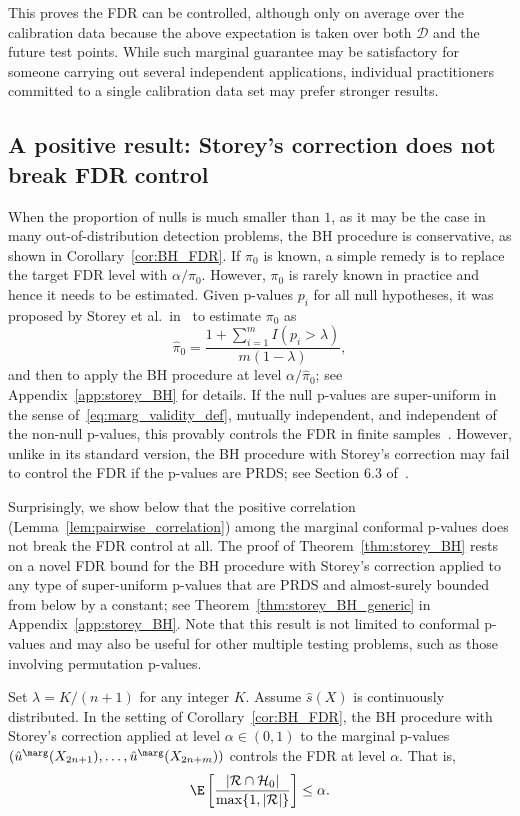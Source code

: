 This proves the FDR can be controlled, although only on average over the calibration data because the above expectation is taken over both $\mathcal{D}$ and the future test points.
While such marginal guarantee may be satisfactory for someone carrying out several independent applications, individual practitioners committed to a single calibration data set may prefer stronger results.

\subsection{A positive result: Storey's correction does not break FDR control}
When the proportion of nulls is much smaller than $1$, as it may be the case in many out-of-distribution detection problems, the BH procedure is conservative, as shown in Corollary~\ref{cor:BH_FDR}. If $\pi_0$ is known, a simple remedy is to replace the target FDR level with $\alpha / \pi_0$. However, $\pi_0$ is rarely known in practice and hence it needs to be estimated. Given p-values $p_i$ for all null hypotheses, it was proposed by Storey et al.~in~\cite{storey2002direct,storey2004strong} to estimate $\pi_0$ as
\[\hat{\pi}_0 = \frac{1 + \sum_{i=1}^{m}I(p_i > \lambda)}{m(1 - \lambda)},\]
and then to apply the BH procedure at level $\alpha / \hat{\pi}_0$; see Appendix~\ref{app:storey_BH} for details.
If the null p-values are super-uniform {in the sense of~\eqref{eq:marg_validity_def}}, mutually independent, and independent of the non-null
p-values, this provably controls the FDR in finite samples~\cite{storey2004strong}.
However, unlike in its standard version, the BH procedure with Storey's correction may fail to control the FDR if the p-values are PRDS; see Section 6.3 of~\cite{benjamini2006adaptive}.

Surprisingly, we show below that the positive correlation (Lemma~\ref{lem:pairwise_correlation}) among the marginal conformal p-values does not break the FDR control at all. The proof of Theorem~\ref{thm:storey_BH} rests on a novel FDR bound for the BH procedure with Storey's correction applied to any type of super-uniform p-values that are PRDS and almost-surely bounded from below by a constant; see Theorem~\ref{thm:storey_BH_generic} in Appendix~\ref{app:storey_BH}. Note that this result is not limited to conformal p-values and may also be useful for other multiple testing problems, such as those involving permutation p-values.

\begin{thm}\label{thm:storey_BH}
Set $\lambda = K / (n+1)$ for any integer $K$. Assume $\hat{s}(X)$ is continuously distributed. In the setting of Corollary~\ref{cor:BH_FDR}, the BH procedure with Storey's correction applied at level $\alpha \in (0,1)$ to the marginal p-values $(\hat{u}^\marg(X_{2n+1}),\dots,\hat{u}^\marg(X_{2n+m}))$ controls the FDR at level $\alpha$. That is,
\begin{equation}
    \E\left[\frac{|\mathcal{R} \cap \mathcal{H}_0|}{\max\{1, |\mathcal{R}|\} } \right] \le \alpha.
\end{equation}
\end{thm}

